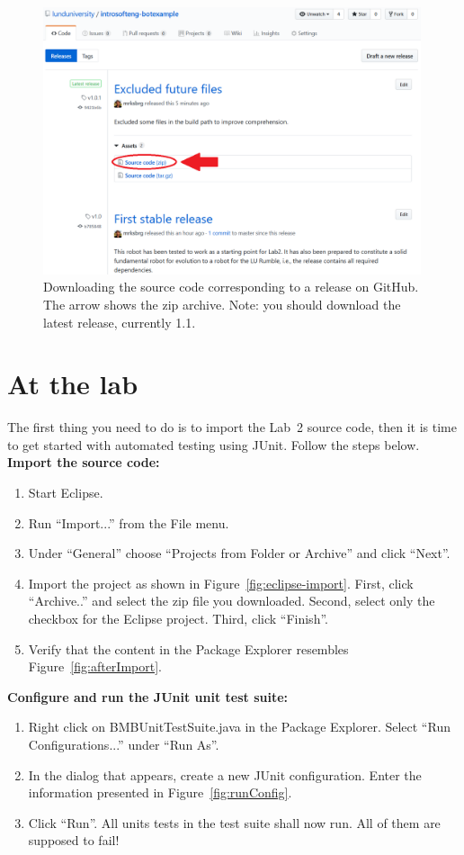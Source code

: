 \documentclass{scrreprt}
\begin{document}
\begin{figure}
\centering
\includegraphics[width=0.99\textwidth]{figures/GitHub-zip.png}
\caption{Downloading the source code corresponding to a release on GitHub. The arrow shows the zip archive. Note: you should download the latest release, currently 1.1.}
\label{fig:github-zip}
\end{figure}

\chapter{At the lab}
The first thing you need to do is to import the Lab~2 source code, then it is time to get started with automated testing using JUnit. Follow the steps below.\\

\textbf{Import the source code:}
\begin{enumerate}
\item Start Eclipse.
\item Run ``Import...'' from the File menu.
\item Under ``General'' choose ``Projects from Folder or Archive'' and click ``Next''.
\item Import the project as shown in Figure~\ref{fig:eclipse-import}. First, click ``Archive..'' and select the zip file you downloaded. Second, select only the checkbox for the Eclipse project. Third, click ``Finish''.
\item Verify that the content in the Package Explorer resembles Figure~\ref{fig:afterImport}.
\end{enumerate}

\textbf{Configure and run the JUnit unit test suite:}
\begin{enumerate}
\item Right click on BMBUnitTestSuite.java in the Package Explorer. Select ``Run Configurations...'' under ``Run As''.
\item In the dialog that appears, create a new JUnit configuration. Enter the information presented in Figure~\ref{fig:runConfig}.
\item Click ``Run''. All units tests in the test suite shall now run. All of them are supposed to fail!
\end{enumerate}
\end{document}
